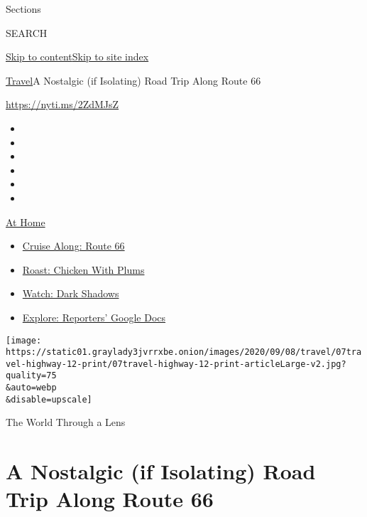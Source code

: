 Sections

SEARCH

\protect\hyperlink{site-content}{Skip to
content}\protect\hyperlink{site-index}{Skip to site index}

\href{/section/travel}{Travel}\textbar{}A Nostalgic (if Isolating) Road
Trip Along Route 66

\url{https://nyti.ms/2ZdMJsZ}

\begin{itemize}
\item
\item
\item
\item
\item
\item
\end{itemize}

\href{https://www.nytimes3xbfgragh.onion/spotlight/at-home?action=click\&pgtype=Article\&state=default\&region=TOP_BANNER\&context=at_home_menu}{At
Home}

\begin{itemize}
\tightlist
\item
  \href{https://www.nytimes3xbfgragh.onion/2020/09/07/travel/route-66.html?action=click\&pgtype=Article\&state=default\&region=TOP_BANNER\&context=at_home_menu}{Cruise
  Along: Route 66}
\item
  \href{https://www.nytimes3xbfgragh.onion/2020/09/04/dining/sheet-pan-chicken.html?action=click\&pgtype=Article\&state=default\&region=TOP_BANNER\&context=at_home_menu}{Roast:
  Chicken With Plums}
\item
  \href{https://www.nytimes3xbfgragh.onion/2020/09/04/arts/television/dark-shadows-stream.html?action=click\&pgtype=Article\&state=default\&region=TOP_BANNER\&context=at_home_menu}{Watch:
  Dark Shadows}
\item
  \href{https://www.nytimes3xbfgragh.onion/interactive/2020/at-home/even-more-reporters-editors-diaries-lists-recommendations.html?action=click\&pgtype=Article\&state=default\&region=TOP_BANNER\&context=at_home_menu}{Explore:
  Reporters' Google Docs}
\end{itemize}

\texttt{[image: https://static01.graylady3jvrrxbe.onion/images/2020/09/08/travel/07travel-highway-12-print/07travel-highway-12-print-articleLarge-v2.jpg?quality=75\\\&auto=webp\\\&disable=upscale]}

The World Through a Lens

\hypertarget{a-nostalgic-if-isolating-road-trip-along-route-66}{%
\section{A Nostalgic (if Isolating) Road Trip Along Route
66}\label{a-nostalgic-if-isolating-road-trip-along-route-66}}

